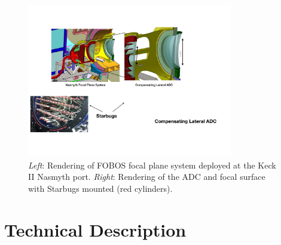 
\begin{figure}[h!]
\includegraphics[width=0.8\textwidth]{figs/FOBOS_FocalPlane_v2.pdf}
\caption{\small {\it
Left}: Rendering of FOBOS focal plane system deployed at the Keck II
Nasmyth port. {\it Right}: Rendering of the ADC and focal surface with
Starbugs mounted (red cylinders).}
\label{fig:focalplane}
\end{figure}

\section{Technical Description}
\label{sec:concept}


